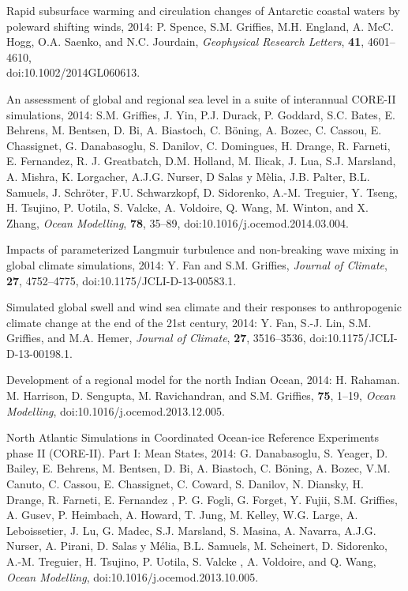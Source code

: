 \begin{etaremune}
\item Rapid subsurface warming and circulation changes of Antarctic coastal waters by poleward shifting winds, 2014: P. Spence, S.M. Grif\/f\/ies, M.H. England, A. McC. Hogg, O.A. Saenko, and N.C. Jourdain, {\it Geophysical Research Letters}, {\bf 41}, 4601--4610, \\  doi:10.1002/2014GL060613.

\item An assessment of global and regional sea level in a suite of interannual CORE-II simulations, 2014: S.M. Grif\/f\/ies, J. Yin, P.J. Durack, P. Goddard, S.C. Bates, E. Behrens, M. Bentsen,  D. Bi, A. Biastoch, C. B\"oning, A. Bozec, C. Cassou, E. Chassignet,
  G. Danabasoglu, S. Danilov, C. Domingues, H. Drange, R. Farneti,  E. Fernandez, R. J. Greatbatch, D.M. Holland, M. Ilicak, J. Lua,
  S.J. Marsland, A. Mishra, K. Lorgacher, A.J.G. Nurser, D Salas y  M\`elia, J.B.  Palter, B.L. Samuels, J. Schr\"oter, F.U. Schwarzkopf, D. Sidorenko, A.-M. Treguier, Y. Tseng,  H. Tsujino, P. Uotila, S. Valcke, A. Voldoire, Q. Wang, M. Winton,  and X. Zhang, {\it Ocean Modelling}, {\bf 78}, 35--89,
  doi:10.1016/j.ocemod.2014.03.004.

\item Impacts of parameterized Langmuir turbulence and non-breaking wave mixing in global climate simulations, 2014: Y. Fan and S.M. Grif\/f\/ies, {\it Journal of Climate}, {\bf 27},  4752--4775, doi:10.1175/JCLI-D-13-00583.1.

\item Simulated global swell and wind sea climate and their responses to anthropogenic climate change at the end of the 21st century,  2014: Y. Fan, S.-J. Lin, S.M. Grif\/f\/ies, and M.A. Hemer, {\it Journal of Climate}, {\bf 27}, 3516--3536, doi:10.1175/JCLI-D-13-00198.1.

\item Development of a regional model for the north Indian Ocean, 2014: H. Rahaman. M. Harrison, D. Sengupta, M.  Ravichandran, and S.M. Grif\/f\/ies, {\bf 75}, 1--19, {\it Ocean Modelling}, doi:10.1016/j.ocemod.2013.12.005.

\item North Atlantic Simulations in Coordinated Ocean-ice Reference Experiments phase II (CORE-II). Part I: Mean States, 2014: G. Danabasoglu, S. Yeager, D. Bailey, E. Behrens, M. Bentsen, D. Bi, A. Biastoch, C. {B\"{o}ning}, A. Bozec, V.M. Canuto, C. Cassou, E. Chassignet, C. Coward, S. Danilov, N. Diansky, H. Drange, R. Farneti, E. Fernandez , P. G. Fogli, G. Forget, Y. Fujii, S.M. Grif\/f\/ies, A.  Gusev, P. Heimbach, A.  Howard, T. Jung,  M. Kelley, W.G. Large, A. Leboissetier, J. Lu, G. Madec, S.J. Marsland, S. Masina, A. Navarra, A.J.G. Nurser, A. Pirani, D. Salas y {M\'{e}lia}, B.L. Samuels, M. Scheinert, D. Sidorenko, A.-M. Treguier, H. Tsujino, P.   Uotila, S. Valcke , A. Voldoire, and Q. Wang, {\it Ocean Modelling}, doi:10.1016/j.ocemod.2013.10.005.


\end{etaremune}

